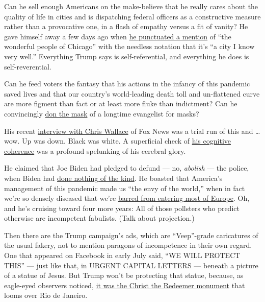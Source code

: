 Can he sell enough Americans on the make-believe that he really cares
about the quality of life in cities and is dispatching federal officers
as a constructive measure rather than a provocative one, in a flash of
empathy versus a fit of vanity? He gave himself away a few days ago when
\href{https://www.whitehouse.gov/briefings-statements/remarks-president-trump-operation-legend-combatting-violent-crime-american-cities/}{he
punctuated a mention} of ``the wonderful people of Chicago'' with the
needless notation that it's ``a city I know very well.'' Everything
Trump says is self-referential, and everything he does is
self-reverential.

Can he feed voters the fantasy that his actions in the infancy of this
pandemic saved lives and that our country's world-leading death toll and
un-flattened curve are more figment than fact or at least more fluke
than indictment? Can he convincingly
\href{https://www.newsweek.com/donald-trump-mask-timeline-avoid-patriotic-1519300}{don
the mask} of a longtime evangelist for masks?

His recent
\href{https://nymag.com/intelligencer/2020/07/trump-interview-chris-wallace-cognitive-dementia-fox-news.html}{interview
with Chris Wallace} of Fox News was a trial run of this and \ldots{}
wow. Up was down. Black was white. A superficial check of
\href{https://www.washingtonpost.com/politics/trump-bragging-cognitive-test-dementia/2020/07/22/6578e826-cb65-11ea-91f1-28aca4d833a0_story.html}{his
cognitive coherence} was a profound spelunking of his cerebral glory.

He claimed that Joe Biden had pledged to defund --- no, \emph{abolish}
--- the police, when Biden had
\href{https://www.factcheck.org/2020/07/trumps-false-recurring-claim-about-bidens-stance-on-police/}{done
nothing of the kind}. He boasted that America's management of this
pandemic made us ``the envy of the world,'' when in fact we're so
densely diseased that we're
\href{https://www.nytimes3xbfgragh.onion/article/eu-travel-ban-explained-usa.html}{barred
from entering most of Europe}. Oh, and he's cruising toward four more
years: All of those pollsters who predict otherwise are incompetent
fabulists. (Talk about projection.)

Then there are the Trump campaign's ads, which are ``Veep''-grade
caricatures of the usual fakery, not to mention paragons of incompetence
in their own regard. One that appeared on Facebook in early July said,
``WE WILL PROTECT THIS'' --- just like that, in URGENT CAPITAL LETTERS
--- beneath a picture of a statue of Jesus. But Trump won't be
protecting that statue, because, as eagle-eyed observers noticed,
\href{https://www.thedailybeast.com/trump-camp-vows-to-protect-brazils-most-iconic-statue-from-left-wing-mobs}{it
was the Christ the Redeemer monument} that looms over Rio de Janeiro.

